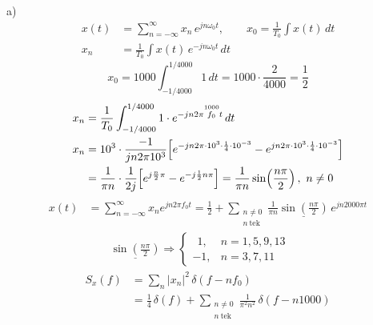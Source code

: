 \documentclass[11pt,a4paper]{article}
\begin{document}
\noindent a)
\begin{align*}
x(t)&=\sum_{n=-\infty}^{\infty}x_n\,e^{jn\omega_0 t},\qquad x_0=\frac{1}{T_0}\int x(t)\,dt\\
x_n&=\frac{1}{T_0}\int x(t)\,e^{-jn\omega_0 t}\,dt
\end{align*}
\[
x_0=1000\int_{-1/4000}^{1/4000}1\,dt=1000\cdot\frac{2}{4000}=\frac12
\]
\begin{align*}
x_n&=\frac{1}{T_0}\int_{-1/4000}^{1/4000}1\cdot e^{-jn2\pi\overset{1000}{f_0}t}\,dt\\
x_n&=10^3\cdot\frac{-1}{jn2\pi10^3}\Bigl[e^{-jn2\pi\cdot10^3\cdot\frac14\cdot10^{-3}}-e^{jn2\pi\cdot10^3\cdot\frac14\cdot10^{-3}}\Bigr]\\
&=\frac{1}{\pi n}\cdot\frac{1}{2j}\Bigl[e^{j\frac{n}{2}\pi}-e^{-j\frac12 n\pi}\Bigr]=\frac{1}{\pi n}\sin\!\left(\frac{n\pi}{2}\right),\ n\neq0
\end{align*}
\begin{align*}
x(t)&=\sum_{n=-\infty}^{\infty}x_n e^{jn2\pi f_0 t}=\frac12+\sum_{\substack{n\neq0\\ n\ \text{tek}}}\frac{1}{\pi n}\underline{\sin\!\left(\frac{n\pi}{2}\right)}\,e^{jn2000\pi t}\\
&\qquad\underline{\sin\!\left(\frac{n\pi}{2}\right)}\Rightarrow\begin{cases}\ \ 1, & n=1,5,9,13\\ -1, & n=3,7,11\end{cases}
\end{align*}
\begin{align*}
S_x(f)&=\sum_n|x_n|^2\,\delta(f-nf_0)\\
&=\frac14\,\delta(f)+\sum_{\substack{n\neq0\\ n\ \text{tek}}}\frac{1}{\pi^2n^2}\,\delta(f-n1000)
\end{align*}

\begin{center}
\end{center}
\end{document}
